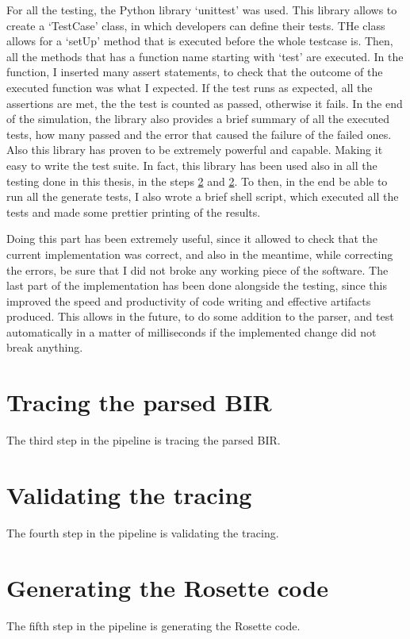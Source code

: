 For all the testing, the Python library `unittest' was used. This library allows
to create a `TestCase' class, in which developers can define their tests. THe class
allows for a `setUp' method that is executed before the whole testcase is. Then,
all the methods that has a function name starting with `test' are executed. In
the function, I inserted many assert statements, to check that the outcome of
the executed function was what I expected. If the test runs as expected, all the
assertions are met, the the test is counted as passed, otherwise it fails. In the
end of the simulation, the library also provides a brief summary of all the
executed tests, how many passed and the error that caused the failure of the failed
ones. Also this library has proven to be extremely powerful and capable. Making it
easy to write the test suite. In fact, this library has been used also in all the
testing done in this thesis, in the steps \ref{cha:Validating the tracing} and
\ref{cha:Validating the tracing}. To then, in the end be able to run all the
generate tests, I also wrote a brief shell script, which executed all the tests
and made some prettier printing of the results.

Doing this part has been extremely useful, since it allowed to check that the current
implementation was correct, and also in the meantime, while correcting the errors,
be sure that I did not broke any working piece of the software. The last part of
the implementation has been done alongside the testing, since this improved the
speed and productivity of code writing and effective artifacts produced. This allows
in the future, to do some addition to the parser, and test automatically in a matter
of milliseconds if the implemented change did not break anything.

\section{Tracing the parsed BIR}
\label{cha:Tracing the parsed BIR} The third step in the pipeline is tracing the
parsed BIR.

\section{Validating the tracing}
\label{cha:Validating the tracing} The fourth step in the pipeline is validating
the tracing.

\section{Generating the Rosette code}
\label{cha:Generating the Rosette code} The fifth step in the pipeline is generating
the Rosette code.

